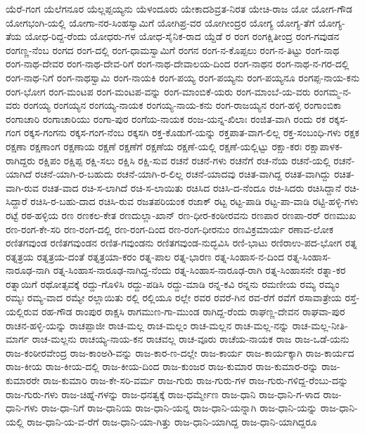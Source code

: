 {ಯೆರೆ-ಗಂಗ
ಯೆಲೆಗನೂರ
ಯೆಲ್ಲಪ್ಪಯ್ಯನು
ಯೆಳಂದೂರು
ಯೇಕಾದಶಿವ್ರತ-ನಿರತ
ಯೇಚಿ-ರಾಜ
ಯೋ
ಯೋಗ-ಗೌಡ
ಯೋಗಭಂಗಿ-ಯಲ್ಲಿ
ಯೋಗಾ-ನರ-ಸಿಂಹಸ್ವಾಮಿಗೆ
ಯೋಗಿಪ್ರ-ವರ
ಯೋಗೀಂದ್ರರ
ಯೋಗ್ಯ
ಯೋಗ್ಯ-ತೆಗೆ
ಯೋಗ್ಯ-ತೆಯ
ಯೋಧ-ರಿದ್ದ-ರೆಂದು
ಯೋಧರು-ಗಳ
ಯೋಧ-ಸೈನಿಕ-ರಾದ
ಯ್ದೆಡೆ
ರ
ರಂಗ
ರಂಗಕ್ಷಿತೀಂದ್ರ
ರಂಗ-ಗವುಡನ
ರಂಗಣ್ಣ-ನೆಂಬ
ರಂಗದ
ರಂಗ-ದಲ್ಲಿ
ರಂಗ-ಧಾಮಸ್ವಾಮಿಗೆ
ರಂಗನ
ರಂಗ-ನ-ಕೊಪ್ಪಲು
ರಂಗ-ನ-ತಿಟ್ಟು
ರಂಗ-ನಾಥ
ರಂಗ-ನಾಥ-ದೇವರ
ರಂಗ-ನಾಥ-ದೇವ-ರಿಗೆ
ರಂಗ-ನಾಥ-ದೇವಾಲಯ-ದಿಂದ
ರಂಗ-ನಾಥನ
ರಂಗ-ನಾಥ-ನ-ಗರ-ದಲ್ಲಿ
ರಂಗ-ನಾಥ-ನಿಗೆ
ರಂಗ-ನಾಥಸ್ವಾಮಿ
ರಂಗ-ನಾಯಕಿ
ರಂಗ-ಪಯ್ಯ
ರಂಗ-ಪಯ್ಯನು
ರಂಗ-ಪಯ್ಯನೂ
ರಂಗಪ್ಪ-ನಾಯ-ಕನು
ರಂಗ-ಭೋಗ
ರಂಗ-ಮಂಟಪ
ರಂಗ-ಮಂಟಪ-ವನ್ನು
ರಂಗ-ಮಾಂಬಿಕೆ-ಯರು
ರಂಗ-ಮಾಂಬೆ-ಯ-ವರು
ರಂಗಮ್ಮ-ನ-ವರು
ರಂಗಯ್ಯ
ರಂಗಯ್ಯನ
ರಂಗಯ್ಯ-ನಾಯಕ
ರಂಗಯ್ಯ-ನಾಯ-ಕನು
ರಂಗ-ರಾಜಯ್ಯನ
ರಂಗ-ಹಳ್ಳಿ
ರಂಗಾಂಬಿಕಾ
ರಂಗಾಚಾರಿ
ರಂಗಾಚಾರಿಯು
ರಂಗಾ-ಪುರ
ರಂಗೆಯ-ನಾಯಕ
ರಂಜ-ಯನ್ನ-ಖಿಲಾಃ
ರಂಜಿತ-ವಾಗಿ
ರಂದು
ರಕ
ರಕ್ಕಸ-ಗಂಗ
ರಕ್ಕಸ-ಗಂಗನು
ರಕ್ಕಸ-ಗಂಗ-ನೆಂಬ
ರಕ್ಕಸಗಿ
ರಕ್ತ-ಕೊಡುಗೆ-ಯನ್ನು
ರಕ್ತಪಾತ-ವಾಗ-ಲಿಲ್ಲ
ರಕ್ತ-ಸಂಬಂಧಿ-ಗಳು
ರಕ್ಷಕ
ರಕ್ಷಣಾ
ರಕ್ಷಣಾಂಗ
ರಕ್ಷಣಾಯ
ರಕ್ಷಣೆ
ರಕ್ಷಣೆಗೆ
ರಕ್ಷಣೆಯ
ರಕ್ಷಣೆ-ಯಲ್ಲಿ
ರಕ್ಷಣೆ-ಯಲ್ಲಿಟ್ಟು
ರಕ್ಷಾ-ಕರಃ
ರಕ್ಷಾಪಾಳಕ-ರಾಗಿದ್ದರು
ರಕ್ಷಿಪಂ
ರಕ್ಷಿಪ್ಪ
ರಕ್ಷಿ-ಸಲು
ರಕ್ಷಿಸಿ
ರಕ್ಷಿ-ಸುವ
ರಚನೆ
ರಚನೆ-ಗಳು
ರಚನೆಗೆ
ರಚ-ನೆಯ
ರಚನೆ-ಯಲ್ಲಿ
ರಚನೆ-ಯಾಗಿದೆ
ರಚನೆ-ಯಾಗಿ-ರ-ಬಹುದು
ರಚನೆ-ಯಾಗಿ-ರ-ಲಿಲ್ಲ
ರಚನೆ-ಯಾದವು
ರಚಿತ-ವಾಗಿದ್ದ
ರಚಿತ-ವಾಗಿದ್ದು
ರಚಿತ-ವಾಗಿ-ರುವ
ರಚಿತ-ವಾದ
ರಚಿ-ಸ-ಲಾಗಿದೆ
ರಚಿ-ಸ-ಲಾಯಿತು
ರಚಿಸಿದ
ರಚಿಸಿ-ದ-ನೆಂದೂ
ರಚಿ-ಸಿದರು
ರಚಿಸಿದ್ದಾನೆ
ರಚಿ-ಸಿದ್ದಾರೆ
ರಚಿಸಿ-ರ-ಬಹು-ದಾದ
ರಚಿಸಿ-ರುವ
ರಜತಪರಿಯಂಕ
ರಜಾಕ್
ರಟ್ಟ
ರಟ್ಟ-ಪಾಡಿ
ರಟ್ಟ-ಪಾ-ವಾಡಿ
ರಟ್ಟಿ-ಹಳ್ಳಿ-ಗಳು
ರಟ್ಟೆ
ರಠ-ಹಳ್ಳಿಯ
ರಣ
ರಣಕಲ-ಕೇತ
ರಣದುಲ್ಲಾ-ಖಾನ್
ರಣ-ಧೀರ-ಕಂಠೀರವನು
ರಣಪಾರ
ರಣಪಾ-ರರ್
ರಣಮುಖ
ರಣ-ರಂಗ-ಕೇ-ಸರಿ
ರಣ-ರಂಗ-ದಲ್ಲಿ
ರಣ-ರಂಗ-ದಿಂದ
ರಣ-ರಂಗ-ಧೀರನುಂ
ರಣವಿಕ್ರಮಾರ್ಯ
ರಣಾವ-ಲೋಕ
ರಣಿತಗವುಂಡ
ರಣಿತಗವುಂಡನ
ರಣಿತ-ಗವುಂಡನು
ರಣಿತಗವುಂಡ-ನುದ್ಭವಿಸಿ
ರಣಿ-ಭಾಟು
ರಣಿರಾಉ-ಪದ-ಭೋಗ
ರತ್ನ
ರತ್ನತ್ರಯ
ರತ್ನತ್ರಯ-ದಂತೆ
ರತ್ನತ್ರಯಾ-ಕರಂ
ರತ್ನ-ಪಾಲ
ರತ್ನ-ಭಾರಣ
ರತ್ನ-ಸಿಂಹಾಸ-ನ-ದಿಂದ
ರತ್ನ-ಸಿಂಹಾಸ-ನಾರೂಢ-ನಾಗಿ
ರತ್ನ-ಸಿಂಹಾಸ-ನಾರೂಢ-ನಾಗಿದ್ದ-ನೆಂದು
ರತ್ನ-ಸಿಂಹಾಸ-ನಾರೂಢ-ರಾಗಿ
ರತ್ನ-ಸಿಂಹಾಸನೇ
ರತ್ನಾ-ಕರ
ರತ್ನಾಯಿಗೆ
ರಥೋತ್ಸವಕ್ಕೆ
ರದ್ದು-ಗೊಳಿಸಿ
ರದ್ದು-ಪಡಿಸಿ
ರದ್ದು-ಮಾಡಿ
ರನ್ನ-ಕವಿ
ರನ್ನನು
ರಮಣೀಯ
ರಮ್ಯ
ರಮ್ಯಂ
ರಮ್ಯಃ
ರಮ್ಯ-ವಾದ
ರಮ್ಯೇ
ರಲ್ಲಾಯಿತು
ರಲ್ಲಿ
ರಲ್ಲಿಯೂ
ರಲ್ಲೇ
ರವರ
ರವರೆ-ಗಿನ
ರವ-ರೆಗೆ
ರವೆಗೆ
ರಸಾವಾತ್ರೇಯ
ರಸ್ತೆ-ಯಲ್ಲಿರುವ
ರಹ-ಗೌಡ
ರಾಂಪುರ
ರಾಕ್ಷಸಿ
ರಾಗಮುಣ-ಗಾ-ಮುಂಡ
ರಾಗಿದ್ದ-ರೆಂದು
ರಾಘಣ್ಣ-ದೇವನ
ರಾಘವಾ-ಪುರ
ರಾಚನ-ಹಳ್ಳಿ-ಯನ್ನು
ರಾಚಪ್ಪಾಜೀ
ರಾಚ-ಮಲ್ಲ
ರಾಚ-ಮಲ್ಲಂ
ರಾಚ-ಮಲ್ಲನ
ರಾಚ-ಮಲ್ಲ-ನನ್ನು
ರಾಚ-ಮಲ್ಲ-ನೀತಿ-ಮಾರ್ಗ
ರಾಚ-ಮಲ್ಲನು
ರಾಚಯ್ಯ-ನಾಯ-ಕನ
ರಾಚವಲ್ಲ
ರಾಚ-ವೂರು
ರಾಚೆಯ-ನಾಯಕ
ರಾಜ
ರಾಜ-ಒಡೆ-ಯನು
ರಾಜ-ಕಂಠೀರವೇಂದ್ರ
ರಾಜ-ಕಾಂಅð-ವನ್ನು
ರಾಜ-ಕಾರ-ಣ-ದಲ್ಲೇ
ರಾಜ-ಕಾರ್ಯ
ರಾಜ-ಕಾರ್ಯಕ್ಕಾಗಿ
ರಾಜ-ಕಾರ್ಯದ
ರಾಜ-ಕೀಯ
ರಾಜ-ಕೀಯ-ದಲ್ಲಿ
ರಾಜ-ಕೀಯ-ದಿಂದ
ರಾಜ-ಕುಂಜರ
ರಾಜ-ಕುಮಾರ
ರಾಜ-ಕುಮಾರ-ರನ್ನು
ರಾಜ-ಕುಮಾರರೇ
ರಾಜ-ಕುಮಾರಿ
ರಾಜ-ಕೇ-ಸರಿ-ವರ್ಮ
ರಾಜ-ಗುರು
ರಾಜ-ಗುರು-ಗಳ
ರಾಜ-ಗುರು-ಗಳಿದ್ದ-ರೆಂಬು-ದನ್ನು
ರಾಜ-ಗುರು-ಗಳು
ರಾಜ-ಚಿಹ್ನೆ-ಗಳನ್ನು
ರಾಜ-ಧನತ್ವಕ್ಕೆ
ರಾಜ-ಧರ್ಮ್ಮೇಣ
ರಾಜ-ಧಾನಿ
ರಾಜ-ಧಾನಿ-ಗ-ಳಾದ
ರಾಜ-ಧಾನಿ-ಗಳು
ರಾಜ-ಧಾ-ನಿಗೆ
ರಾಜ-ಧಾನಿಯ
ರಾಜ-ಧಾನಿ-ಯನ್ನ
ರಾಜ-ಧಾನಿ-ಯನ್ನಾಗಿ
ರಾಜ-ಧಾನಿ-ಯನ್ನು
ರಾಜ-ಧಾನಿ-ಯಲ್ಲಿ
ರಾಜ-ಧಾನಿ-ಯ-ವ-ರೆಗೆ
ರಾಜ-ಧಾನಿ-ಯಾ-ಗಿತ್ತು
ರಾಜ-ಧಾನಿ-ಯಾಗಿದ್ದ
ರಾಜ-ಧಾನಿ-ಯಾಗಿದ್ದರೂ
}
